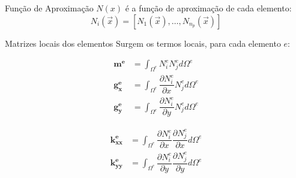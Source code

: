 \documentclass{beamer}
\begin{document}
\begin{frame}
  \frametitle{\subsecname}
  
  \begin{block}{Função de Aproximação}
    $N(x)$ é a função de aproximação de cada elemento:
    \begin{equation*}
      N_{i}(\vec{x}) = [N_{1}(\vec{x}), \ldots, N_{n_p}(\vec{x})]
    \end{equation*}
  \end{block}
  
  \begin{block}{Matrizes locais dos elementos}
    Surgem os termos locais, para cada elemento $e$:
    \begin{minipage}{.45\textwidth}
      \vspace*{-\baselineskip}\setlength\belowdisplayshortskip{0pt} %
      \vspace{5pt}
      \begin{align*}
	\mathbf{m^e} &=
	\int_{\Omega^e}
	N_i^e N_j^e
	d\Omega^e \\
	\mathbf{g_x^e} &=
	\int_{\Omega^e}
	\dfrac{\partial N_i^e}{\partial x}
	N_j^e
	d\Omega^e \\
	\mathbf{g_y^e} &=
	\int_{\Omega^e}
	\dfrac{\partial N_i^e}{\partial y}
	N_j^e
	d\Omega^e
      \end{align*}
    \end{minipage}
    \hfill
    \begin{minipage}{.45\textwidth}
      \vspace*{-\baselineskip}\setlength\belowdisplayshortskip{0pt} %
      \begin{align*}
	\mathbf{k_{xx}^e} &=
	\int_{\Omega^e}
	\dfrac{\partial N_i^e}{\partial x}
	\dfrac{\partial N_j^e}{\partial x}
	d\Omega^e \\
	\mathbf{k_{yy}^e} &=
	\int_{\Omega^e}
	\dfrac{\partial N_i^e}{\partial y}
	\dfrac{\partial N_j^e}{\partial y}
	d\Omega^e
      \end{align*}
    \end{minipage}
  \end{block}
\end{frame}
  
\end{document}

